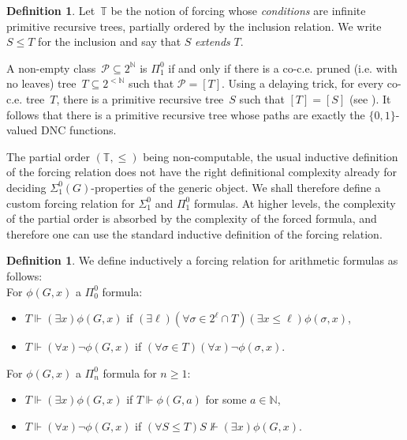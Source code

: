 \documentclass{article}
\def\NN{\mathbb{N}}
\def\TT{\mathbb{T}}
\def\P{\mathcal{P}}
\newcommand{\cs}{2^{\NN}}
\newcommand{\bstr}{2^{<\NN}}
\numberwithin{theorem}{section}
\theoremstyle{definition}
\newtheorem{definition}[theorem]{Definition}
\begin{document}
\begin{definition}
    Let~$\TT$ be the notion of forcing whose \emph{conditions} are infinite primitive recursive trees, partially ordered by the inclusion relation. We write $S \leq T$ for the inclusion and say that $S$ \emph{extends} $T$. 
\end{definition}

A non-empty class~$\P \subseteq \cs$ is $\Pi^0_1$ if and only if there is a co-c.e. pruned (i.e. with no leaves) tree~$T \subseteq \bstr$ such that $\P = [T]$. Using a delaying trick, for every co-c.e. tree~$T$, there is a primitive recursive tree~$S$ such that $[T] = [S]$ (see \cite[Lemma 3.8]{wang2016definability}).
It follows that there is a primitive recursive tree whose paths are exactly the $\{0,1\}$-valued DNC functions. 

The partial order $(\TT, \leq)$ being non-computable, the usual inductive definition of the forcing relation
does not have the right definitional complexity already for deciding $\Sigma^0_1(G)$-properties of the generic object. We shall therefore define a custom forcing relation for $\Sigma^0_1$ and $\Pi^0_1$ formulas. At higher levels, the complexity of the partial order is absorbed by the complexity of the forced formula, and therefore one can use the standard inductive definition of the forcing relation.

\begin{definition}
    We define inductively a forcing relation for arithmetic formulas as follows:\\
    For $\phi(G,x)$ a $\Pi_0^0$ formula:
    \begin{itemize}
        \item $T \Vdash (\exists x)\phi(G,x)$ if $ (\exists \ell)(\forall \sigma \in 2^{\ell} \cap T)(\exists x \leq \ell) \phi(\sigma,x)$,
        \item $T \Vdash (\forall x) \neg \phi(G,x)$ if $(\forall \sigma \in T)(\forall x) \neg \phi(\sigma,x)$.
    \end{itemize}
    For $\phi(G,x)$ a $\Pi_n^0$ formula for $n \geq 1$:
    \begin{itemize}
         \item $T \Vdash (\exists x) \phi(G,x)$ if $ T \Vdash \phi(G,a)$ for some $a \in \NN$,
        \item $T \Vdash(\forall x) \neg \phi(G,x)$ if $(\forall S \leq T) S \not \Vdash (\exists x) \phi(G,x)$.
    \end{itemize}
\end{definition}
\end{document}
